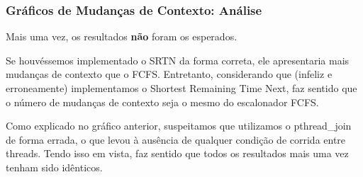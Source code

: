 \documentclass{beamer}
\begin{document}
\begin{frame}
\blindtext

\end{frame}




\begin{frame}
\frametitle{Gráficos de Mudanças de Contexto: Análise}

Mais uma vez, os resultados \textbf{não} foram os esperados.

\item Se houvéssemos implementado o SRTN da forma correta, ele apresentaria mais mudanças de contexto que o FCFS. Entretanto, considerando que (infeliz e erroneamente) implementamos o Shortest Remaining Time Next, faz sentido que o número de mudanças de contexto seja o mesmo do escalonador FCFS.

\item Como explicado no gráfico anterior, suspeitamos que utilizamos o pthread\_join de forma errada, o que levou à ausência de qualquer condição de corrida entre threads. Tendo isso em vista, faz sentido que todos os resultados mais uma vez tenham sido idênticos.


\end{frame}
\end{document}
